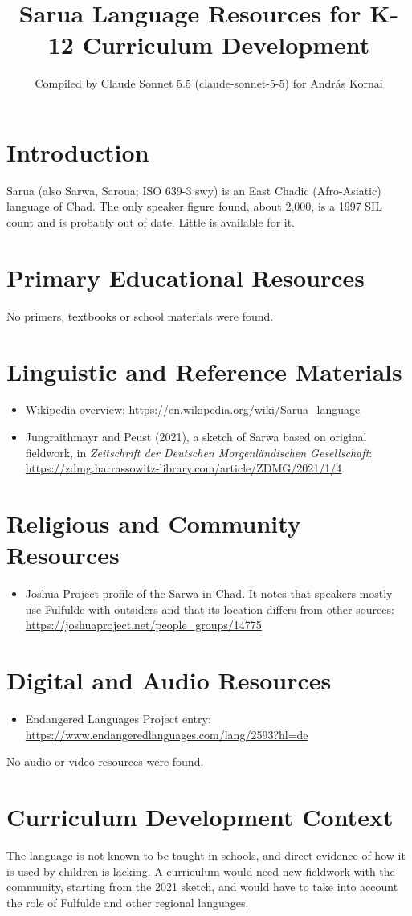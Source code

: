 \documentclass[12pt]{article}
\title{Sarua Language Resources for K-12 Curriculum Development}
\author{Compiled by Claude Sonnet 5.5 (claude-sonnet-5-5) for Andr\'as Kornai}
\date{}
\begin{document}
\maketitle

\section{Introduction}
Sarua (also Sarwa, Saroua; ISO 639-3 swy) is an East Chadic (Afro-Asiatic) language of Chad. The only speaker figure found, about 2,000, is a 1997 SIL count and is probably out of date. Little is available for it.

\section{Primary Educational Resources}
No primers, textbooks or school materials were found.

\section{Linguistic and Reference Materials}
\begin{itemize}
\item Wikipedia overview: \url{https://en.wikipedia.org/wiki/Sarua_language}
\item Jungraithmayr and Peust (2021), a sketch of Sarwa based on original fieldwork, in \emph{Zeitschrift der Deutschen Morgenl\"andischen Gesellschaft}: \url{https://zdmg.harrassowitz-library.com/article/ZDMG/2021/1/4}
\end{itemize}

\section{Religious and Community Resources}
\begin{itemize}
\item Joshua Project profile of the Sarwa in Chad. It notes that speakers mostly use Fulfulde with outsiders and that its location differs from other sources: \url{https://joshuaproject.net/people_groups/14775}
\end{itemize}

\section{Digital and Audio Resources}
\begin{itemize}
\item Endangered Languages Project entry: \url{https://www.endangeredlanguages.com/lang/2593?hl=de}
\end{itemize}
No audio or video resources were found.

\section{Curriculum Development Context}
The language is not known to be taught in schools, and direct evidence of how it is used by children is lacking. A curriculum would need new fieldwork with the community, starting from the 2021 sketch, and would have to take into account the role of Fulfulde and other regional languages.
\end{document}
